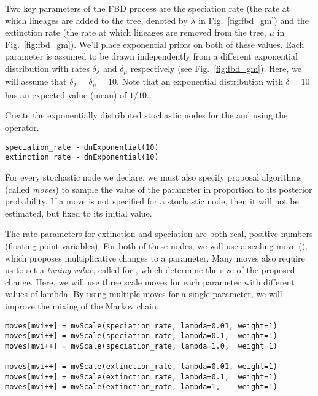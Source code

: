 Two key parameters of the FBD process are the speciation rate (the rate at which lineages are added to the tree, denoted by $\lambda$ in Fig.\ \ref{fig:fbd_gm}) and the extinction rate (the rate at which lineages are removed from the tree, $\mu$ in Fig.\ \ref{fig:fbd_gm}). 
We'll place exponential priors on both of these values. 
Each parameter is assumed to be drawn independently from a different exponential distribution with rates $\delta_{\lambda}$ and $\delta_{\mu}$ respectively (see Fig.\ \ref{fig:fbd_gm}). 
Here, we will assume that $\delta_{\lambda} = \delta_{\mu} = 10$. 
Note that an exponential distribution with $\delta = 10$ has an expected value (mean) of $1/10$. 

Create the exponentially distributed stochastic nodes for the  and  using the \cl{\textasciitilde} operator.
{\tt \begin{snugshade*}
\begin{lstlisting}
speciation_rate ~ dnExponential(10)
extinction_rate ~ dnExponential(10)
\end{lstlisting}
\end{snugshade*}}

For every stochastic node we declare, we must also specify proposal algorithms (called \textit{moves}) to sample the value of the parameter in proportion to its posterior probability.
If a move is not specified for a stochastic node, then it will not be estimated, but fixed to its initial value. 

The rate parameters for extinction and speciation are both real, positive numbers (\IE floating point variables). 
For both of these nodes, we will use a scaling move (), which proposes multiplicative changes to a parameter.
Many moves also require us to set a \textit{tuning value}, called  for , which determine the size of the proposed change. 
Here, we will use three scale moves for each parameter with  different values of lambda. 
By using multiple moves for a single parameter, we will improve the mixing of the Markov chain. 
{\tt \begin{snugshade*}
\begin{lstlisting}
moves[mvi++] = mvScale(speciation_rate, lambda=0.01, weight=1)
moves[mvi++] = mvScale(speciation_rate, lambda=0.1,  weight=1)
moves[mvi++] = mvScale(speciation_rate, lambda=1.0,  weight=1)

moves[mvi++] = mvScale(extinction_rate, lambda=0.01, weight=1)
moves[mvi++] = mvScale(extinction_rate, lambda=0.1,  weight=1)
moves[mvi++] = mvScale(extinction_rate, lambda=1,    weight=1)
\end{lstlisting}
\end{snugshade*}}

